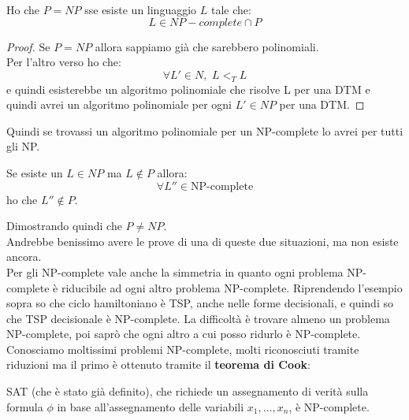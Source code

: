 \begin{teorema}
  Ho che $P=NP$ sse esiste un linguaggio $L$ tale che:
  \[L\in NP-complete\cap P\]
\end{teorema}
\begin{proof}
  Se $P=NP$ allora sappiamo già che sarebbero polinomiali.\\
  Per l'altro verso ho che:
  \[\forall L'\in N, \,\,L<_T L\]
  e quindi esisterebbe un algoritmo polinomiale che risolve L per una DTM e
  quindi avrei un algoritmo polinomiale per ogni $L'\in NP$ per una DTM.
\end{proof}
Quindi se trovassi un algoritmo polinomiale per un NP-complete lo avrei per
tutti gli NP.
\begin{teorema}
  Se esiste un $L\in NP$ ma $L\not\in P$ allora:
  \[\forall L''\in \mbox{NP-complete}\]
  ho che $L''\not\in P$.
\end{teorema}
Dimostrando quindi che $P\neq NP$.\\
Andrebbe benissimo avere le prove di una di queste due situazioni, ma non esiste
ancora.\\
Per gli NP-complete vale anche la simmetria in quanto ogni problema NP-complete
è riducibile ad ogni altro problema NP-complete. Riprendendo l'esempio sopra so
che ciclo hamiltoniano è TSP, anche nelle forme decisionali, e quindi so che TSP
decisionale è NP-complete. La difficoltà è trovare almeno un problema
NP-complete, poi saprò che ogni altro a cui posso ridurlo è NP-complete.\\
Conosciamo moltissimi problemi NP-complete, molti riconosciuti tramite riduzioni
ma il primo è ottenuto tramite il \textbf{teorema di Cook}:
\begin{teorema}
  SAT (che è stato già definito), che richiede un assegnamento di verità sulla
  formula $\phi$ in base all'assegnamento delle variabili $x_1,\ldots,x_n$, è
  NP-complete. 
\end{teorema}
